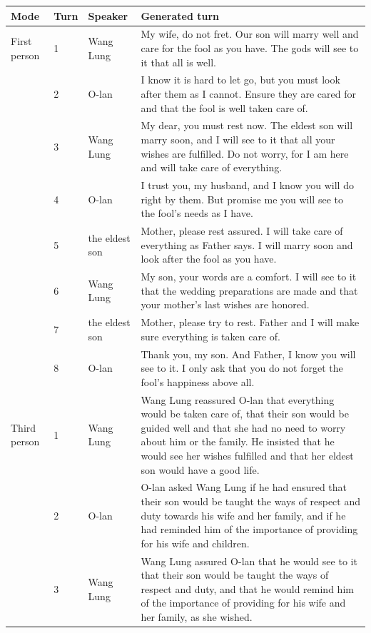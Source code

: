 \begin{tabular}{llp{1.8cm}p{9.0cm}}
\toprule
Mode & Turn & Speaker & Generated turn \\
\midrule
First person & 1 & Wang Lung & My wife, do not fret. Our son will marry well and care for the fool as you have. The gods will see to it that all is well. \\
 & 2 & O-lan & I know it is hard to let go, but you must look after them as I cannot. Ensure they are cared for and that the fool is well taken care of. \\
 & 3 & Wang Lung & My dear, you must rest now. The eldest son will marry soon, and I will see to it that all your wishes are fulfilled. Do not worry, for I am here and will take care of everything. \\
 & 4 & O-lan & I trust you, my husband, and I know you will do right by them. But promise me you will see to the fool's needs as I have. \\
 & 5 & the eldest son & Mother, please rest assured. I will take care of everything as Father says. I will marry soon and look after the fool as you have. \\
 & 6 & Wang Lung & My son, your words are a comfort. I will see to it that the wedding preparations are made and that your mother's last wishes are honored. \\
 & 7 & the eldest son & Mother, please try to rest. Father and I will make sure everything is taken care of. \\
 & 8 & O-lan & Thank you, my son. And Father, I know you will see to it. I only ask that you do not forget the fool's happiness above all. \\
Third person & 1 & Wang Lung & Wang Lung reassured O-lan that everything would be taken care of, that their son would be guided well and that she had no need to worry about him or the family. He insisted that he would see her wishes fulfilled and that her eldest son would have a good life. \\
 & 2 & O-lan & O-lan asked Wang Lung if he had ensured that their son would be taught the ways of respect and duty towards his wife and her family, and if he had reminded him of the importance of providing for his wife and children. \\
 & 3 & Wang Lung & Wang Lung assured O-lan that he would see to it that their son would be taught the ways of respect and duty, and that he would remind him of the importance of providing for his wife and her family, as she wished. \\

\end{tabular}
